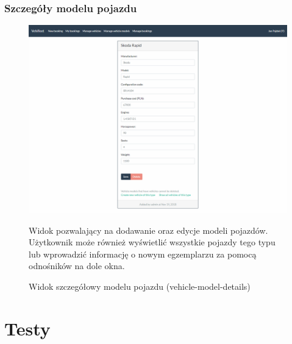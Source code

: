 \documentclass[eng,printmode,openany]{mgr}
\begin{document}
\subsection{Szczegóły modelu pojazdu}
\begin{figure}[H]
	\centering
	\includegraphics[width=\textwidth]{images/views/vehicle-model-detail.png}
	\caption{Widok szczegółowy modelu pojazdu (vehicle-model-details)}
	\small 
	Widok pozwalający na dodawanie oraz edycje modeli pojazdów. Użytkownik może również wyświetlić wszystkie pojazdy tego typu lub wprowadzić informację o nowym egzemplarzu za pomocą odnośników na dole okna.
\end{figure}


\newpage
\chapter{Testy}
\end{document}
